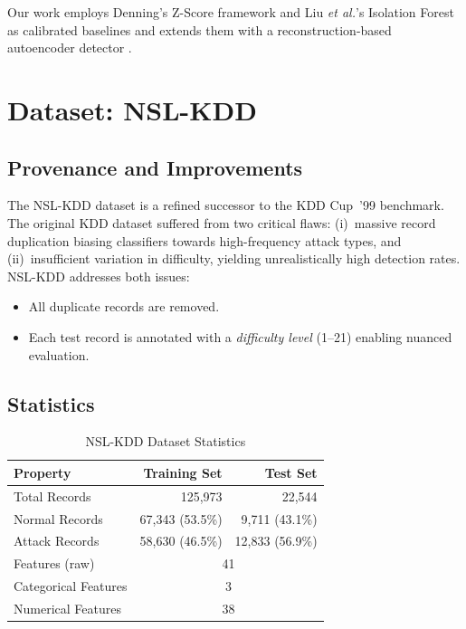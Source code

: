 \documentclass[conference]{IEEEtran}
\begin{document}
Our work employs Denning's Z-Score framework and Liu \emph{et al.}'s Isolation
Forest as calibrated baselines and extends them with a reconstruction-based
autoencoder detector \cite{ae_network_traffic}.

\section{Dataset: NSL-KDD}
\label{sec:dataset}

\subsection{Provenance and Improvements}
The NSL-KDD dataset \cite{tavallaee2009} is a refined successor to the KDD Cup~'99
benchmark.  The original KDD dataset suffered from two critical flaws: (i)~massive
record duplication biasing classifiers towards high-frequency attack types, and
(ii)~insufficient variation in difficulty, yielding unrealistically high detection
rates.  NSL-KDD addresses both issues:
\begin{itemize}
  \item All duplicate records are removed.
  \item Each test record is annotated with a \emph{difficulty level} (1--21)
        enabling nuanced evaluation.
\end{itemize}

\subsection{Statistics}
\begin{table}[H]
  \centering
  \caption{NSL-KDD Dataset Statistics}
  \label{tab:dataset}
  \begin{tabular}{lrr}
    \toprule
    \textbf{Property}          & \textbf{Training Set} & \textbf{Test Set} \\
    \midrule
    Total Records              & 125,973               & 22,544            \\
    Normal Records             & 67,343 (53.5\%)       & 9,711 (43.1\%)    \\
    Attack Records             & 58,630 (46.5\%)       & 12,833 (56.9\%)   \\
    Features (raw)             & \multicolumn{2}{c}{41}                    \\
    Categorical Features       & \multicolumn{2}{c}{3}                     \\
    Numerical Features         & \multicolumn{2}{c}{38}                    \\
    \bottomrule
  \end{tabular}
\end{table}
\end{document}
